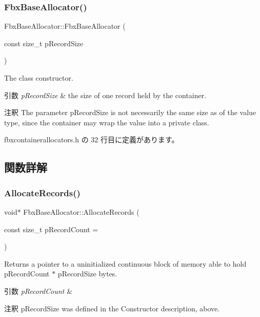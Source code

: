 \subsubsection{\texorpdfstring{Fbx\+Base\+Allocator()}{FbxBaseAllocator()}}
{\footnotesize\ttfamily Fbx\+Base\+Allocator\+::\+Fbx\+Base\+Allocator (\begin{DoxyParamCaption}\item[{const size\+\_\+t}]{p\+Record\+Size }\end{DoxyParamCaption})\hspace{0.3cm}{\ttfamily [inline]}}

The class constructor. 
\begin{DoxyParams}{引数}
{\em p\+Record\+Size} & the size of one record held by the container. \\
\hline
\end{DoxyParams}
\begin{DoxyRemark}{注釈}
The parameter p\+Record\+Size is not necessarily the same size as of the value type, since the container may wrap the value into a private class. 
\end{DoxyRemark}


 fbxcontainerallocators.\+h の 32 行目に定義があります。



\subsection{関数詳解}
\mbox{\label{class_fbx_base_allocator_a3701773862fa1a808aaff72a3b541d8f}} 
\subsubsection{\texorpdfstring{Allocate\+Records()}{AllocateRecords()}}
{\footnotesize\ttfamily void$\ast$ Fbx\+Base\+Allocator\+::\+Allocate\+Records (\begin{DoxyParamCaption}\item[{const size\+\_\+t}]{p\+Record\+Count = {} }\end{DoxyParamCaption})\hspace{0.3cm}{\ttfamily [inline]}}

Returns a pointer to a uninitialized continuous block of memory able to hold p\+Record\+Count $\ast$ p\+Record\+Size bytes. 
\begin{DoxyParams}{引数}
{\em p\+Record\+Count} & \\
\hline
\end{DoxyParams}
\begin{DoxyRemark}{注釈}
p\+Record\+Size was defined in the Constructor description, above. 
\end{DoxyRemark}


